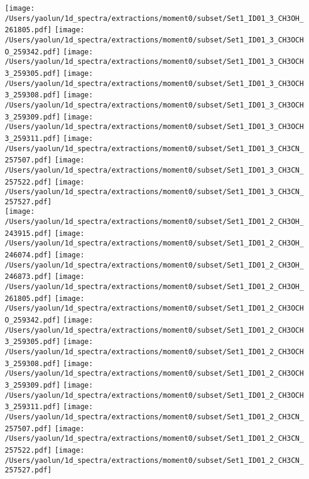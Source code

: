 \begin{figure*}[htbp!]
  \texttt{[image: /Users/yaolun/1d\_spectra/extractions/moment0/subset/Set1\_ID01\_3\_CH3OH\_261805.pdf]}
  \texttt{[image: /Users/yaolun/1d\_spectra/extractions/moment0/subset/Set1\_ID01\_3\_CH3OCHO\_259342.pdf]}
  \texttt{[image: /Users/yaolun/1d\_spectra/extractions/moment0/subset/Set1\_ID01\_3\_CH3OCH3\_259305.pdf]}
  \texttt{[image: /Users/yaolun/1d\_spectra/extractions/moment0/subset/Set1\_ID01\_3\_CH3OCH3\_259308.pdf]}
  \texttt{[image: /Users/yaolun/1d\_spectra/extractions/moment0/subset/Set1\_ID01\_3\_CH3OCH3\_259309.pdf]}
  \texttt{[image: /Users/yaolun/1d\_spectra/extractions/moment0/subset/Set1\_ID01\_3\_CH3OCH3\_259311.pdf]}
  \texttt{[image: /Users/yaolun/1d\_spectra/extractions/moment0/subset/Set1\_ID01\_3\_CH3CN\_257507.pdf]}
  \texttt{[image: /Users/yaolun/1d\_spectra/extractions/moment0/subset/Set1\_ID01\_3\_CH3CN\_257522.pdf]}
  \texttt{[image: /Users/yaolun/1d\_spectra/extractions/moment0/subset/Set1\_ID01\_3\_CH3CN\_257527.pdf]}
  \\
  \texttt{[image: /Users/yaolun/1d\_spectra/extractions/moment0/subset/Set1\_ID01\_2\_CH3OH\_243915.pdf]}
  \texttt{[image: /Users/yaolun/1d\_spectra/extractions/moment0/subset/Set1\_ID01\_2\_CH3OH\_246074.pdf]}
  \texttt{[image: /Users/yaolun/1d\_spectra/extractions/moment0/subset/Set1\_ID01\_2\_CH3OH\_246873.pdf]}
  \texttt{[image: /Users/yaolun/1d\_spectra/extractions/moment0/subset/Set1\_ID01\_2\_CH3OH\_261805.pdf]}
  \texttt{[image: /Users/yaolun/1d\_spectra/extractions/moment0/subset/Set1\_ID01\_2\_CH3OCHO\_259342.pdf]}
  \texttt{[image: /Users/yaolun/1d\_spectra/extractions/moment0/subset/Set1\_ID01\_2\_CH3OCH3\_259305.pdf]}
  \texttt{[image: /Users/yaolun/1d\_spectra/extractions/moment0/subset/Set1\_ID01\_2\_CH3OCH3\_259308.pdf]}
  \texttt{[image: /Users/yaolun/1d\_spectra/extractions/moment0/subset/Set1\_ID01\_2\_CH3OCH3\_259309.pdf]}
  \texttt{[image: /Users/yaolun/1d\_spectra/extractions/moment0/subset/Set1\_ID01\_2\_CH3OCH3\_259311.pdf]}
  \texttt{[image: /Users/yaolun/1d\_spectra/extractions/moment0/subset/Set1\_ID01\_2\_CH3CN\_257507.pdf]}
  \texttt{[image: /Users/yaolun/1d\_spectra/extractions/moment0/subset/Set1\_ID01\_2\_CH3CN\_257522.pdf]}
  \texttt{[image: /Users/yaolun/1d\_spectra/extractions/moment0/subset/Set1\_ID01\_2\_CH3CN\_257527.pdf]}

\end{figure*}
